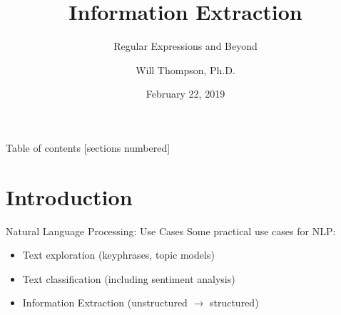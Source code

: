 \documentclass[10pt]{beamer}
\title{Information Extraction}
\subtitle{Regular Expressions and Beyond}
\date{February 22, 2019}
\author{Will Thompson, Ph.D.}
\begin{document}
\maketitle

\begin{frame}{Table of contents}
  [sections numbered]
  \tableofcontents[hideallsubsections]
\end{frame}

\section{Introduction}

\begin{frame}[fragile]{Natural Language Processing: Use Cases}
  Some practical use cases for NLP:
  \begin{itemize}
    \item Text exploration (keyphrases, topic models)
    \item Text classification (including sentiment analysis)
    \item \alert{Information Extraction (unstructured $\rightarrow$ structured)}
  \end{itemize}
\end{frame}
\end{document}
